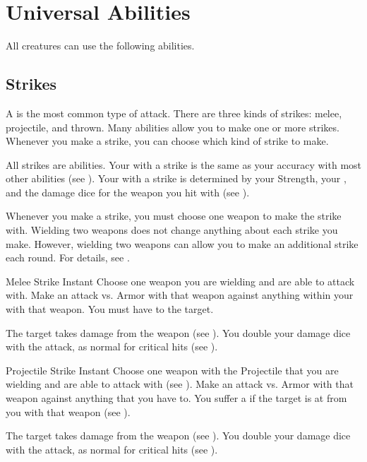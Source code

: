 \section{Universal Abilities}\label{Universal Abilities}
    All creatures can use the following abilities.

    \subsection{Strikes}\label{Strikes}
        A  is the most common type of attack.
        There are three kinds of strikes: melee, projectile, and thrown.
        Many abilities allow you to make one or more strikes.
        Whenever you make a strike, you can choose which kind of strike to make.

        All strikes are  abilities.
        Your  with a strike is the same as your accuracy with most other abilities (see ).
        Your  with a strike is determined by your Strength, your , and the damage dice for the weapon you hit with (see ).

        Whenever you make a strike, you must choose one weapon to make the strike with.
        Wielding two weapons does not change anything about each strike you make.
        However, wielding two weapons can allow you to make an additional strike each round.
        For details, see .

        \begin{activeability}{Melee Strike}
            \label{Melee Strike}
            Instant
            \rankline
            Choose one weapon you are wielding and are able to attack with.
            Make an attack vs. Armor with that weapon against anything within your  with that weapon.
            You must have  to the target.

            \hit The target takes damage from the weapon (see ).
            \crit You double your damage dice with the attack, as normal for critical hits (see ).
        \end{activeability}

        \begin{activeability}{Projectile Strike}
            \label{Projectile Strike}
            Instant
            \rankline
            Choose one weapon with the Projectile  that you are wielding and are able to attack with (see ).
            Make an attack vs. Armor with that weapon against anything that you have  to.
            You suffer a  if the target is at  from you with that weapon (see ).

            \hit The target takes damage from the weapon (see ).
            \crit You double your damage dice with the attack, as normal for critical hits (see ).
        \end{activeability}

